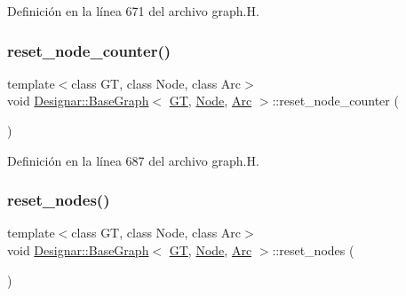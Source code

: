 Definición en la línea 671 del archivo graph.\+H.

\mbox{\label{class_designar_1_1_base_graph_a53603f64b51b470cc6b8c8d6d2b643a4}} 
\subsubsection{\texorpdfstring{reset\+\_\+node\+\_\+counter()}{reset\_node\_counter()}}
{\footnotesize\ttfamily template$<$class GT, class Node, class Arc$>$ \\
void \hyperlink{class_designar_1_1_base_graph}{Designar\+::\+Base\+Graph}$<$ \hyperlink{demo-buildgraph_8_c_a3001c40d2c31ca87ed96cd7d1334a55e}{GT}, \hyperlink{namespace_designar_a5af326c65aa2bd26b26c410f2030d09e}{Node}, \hyperlink{namespace_designar_a3f55fb5513d62ff47cbc8f72b8e95d6f}{Arc} $>$\+::reset\+\_\+node\+\_\+counter (\begin{DoxyParamCaption}{ }\end{DoxyParamCaption})\hspace{0.3cm}{\ttfamily [inline]}}



Definición en la línea 687 del archivo graph.\+H.

\mbox{\label{class_designar_1_1_base_graph_a1b21c48fed41f36ad4158d718f837c89}} 
\subsubsection{\texorpdfstring{reset\+\_\+nodes()}{reset\_nodes()}}
{\footnotesize\ttfamily template$<$class GT, class Node, class Arc$>$ \\
void \hyperlink{class_designar_1_1_base_graph}{Designar\+::\+Base\+Graph}$<$ \hyperlink{demo-buildgraph_8_c_a3001c40d2c31ca87ed96cd7d1334a55e}{GT}, \hyperlink{namespace_designar_a5af326c65aa2bd26b26c410f2030d09e}{Node}, \hyperlink{namespace_designar_a3f55fb5513d62ff47cbc8f72b8e95d6f}{Arc} $>$\+::reset\+\_\+nodes (\begin{DoxyParamCaption}{ }\end{DoxyParamCaption})\hspace{0.3cm}{\ttfamily [inline]}}



